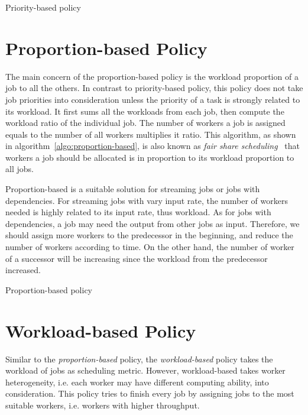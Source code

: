 \begin{algorithm}[htbp]
  
  \caption{Priority-based policy}
  \label{algo:priority-based}
\end{algorithm}

\section{Proportion-based Policy}

The main concern of the proportion-based policy is the workload
proportion of a job to all the others.
In contrast to priority-based policy, this policy does not take job
priorities into consideration unless the priority of a task is strongly
related to its workload.
It first sums all the workloads from each job, then compute the workload
ratio of the individual job.
The number of workers a job is assigned equals to the number of all 
workers multiplies it ratio.
This algorithm, as shown in algorithm~\ref{algo:proportion-based}, is
also known as \emph{fair share
scheduling}~\cite{ite:fair-share-scheduling} that workers a job should
be allocated is in proportion to its workload proportion to all jobs. 

Proportion-based is a suitable solution for streaming jobs or jobs with
dependencies.
For streaming jobs with vary input rate, the number of workers needed is
highly related to its input rate, thus workload.
As for jobs with dependencies, a job may need the output from other 
jobs as input.
Therefore, we should assign more workers to the predecessor in the
beginning, and reduce the number of workers according to time.
On the other hand, the number of worker of a successor will be 
increasing since the workload from the predecessor increased.

\begin{algorithm}[htbp]
  
  \caption{Proportion-based policy}
  \label{algo:proportion-based}
\end{algorithm}


\section{Workload-based Policy}


Similar to the \emph{proportion-based} policy, the \emph{workload-based}
policy takes the workload of jobs as scheduling metric.
However, workload-based takes worker heterogeneity, i.e. each
worker may have different computing ability, into consideration.
This policy tries to finish every job by assigning jobs to the most
suitable workers, i.e. workers with higher throughput.

